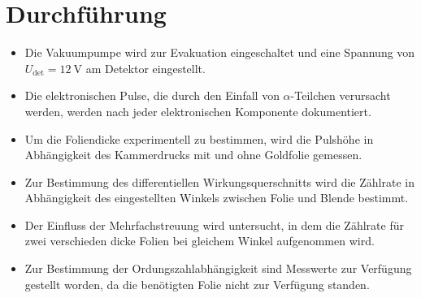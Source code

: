 \section{Durchführung}
\label{sec:Durchführung}
\begin{itemize}
\item Die Vakuumpumpe wird zur Evakuation eingeschaltet und eine Spannung von $U_\text{det}=\SI{12}{\volt}$ am Detektor eingestellt.

\item Die elektronischen Pulse, die durch den Einfall von $\alpha$-Teilchen verursacht werden, werden nach jeder elektronischen Komponente dokumentiert.

\item Um die Foliendicke experimentell zu bestimmen, wird die Pulshöhe in Abhängigkeit des Kammerdrucks mit und ohne Goldfolie gemessen.

\item Zur Bestimmung des differentiellen Wirkungsquerschnitts wird die Zählrate in Abhängigkeit des eingestellten Winkels zwischen Folie und Blende bestimmt.

\item Der Einfluss der Mehrfachstreuung wird untersucht, in dem die Zählrate für zwei verschieden dicke Folien bei gleichem Winkel aufgenommen wird.

\item Zur Bestimmung der Ordungszahlabhängigkeit sind Messwerte zur Verfügung gestellt worden, da die benötigten Folie nicht zur Verfügung standen. 
\end{itemize}

